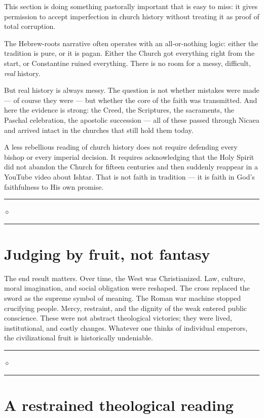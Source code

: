 \documentclass[10pt,twoside,openany]{book}
\newcommand{\ornrule}{%
  \par\bigskip
  {\noindent\hfil{\color{gold}\rule[0.5ex]{1.5in}{0.5pt}%
  \quad$\diamond$\quad%
  \rule[0.5ex]{1.5in}{0.5pt}}\hfil\par}%
  \bigskip
}
\begin{document}
\begin{westernbox}
This section is doing something pastorally important
that is easy to miss: it gives permission to accept
imperfection in church history without treating it as
proof of total corruption.

The Hebrew-roots narrative often operates with an
all-or-nothing logic: either the tradition is pure, or
it is pagan. Either the Church got everything right
from the start, or Constantine ruined everything. There
is no room for a messy, difficult, \emph{real} history.

But real history is always messy. The question is not
whether mistakes were made --- of course they were --- but
whether the core of the faith was transmitted. And here
the evidence is strong: the Creed, the Scriptures, the
sacraments, the Paschal celebration, the apostolic
succession --- all of these passed through Nicaea and
arrived intact in the churches that still hold them
today.

A less rebellious reading of church history does not
require defending every bishop or every imperial
decision. It requires acknowledging that the Holy
Spirit did not abandon the Church for fifteen centuries
and then suddenly reappear in a YouTube video about
Ishtar. That is not faith in tradition --- it is faith in
God's faithfulness to His own promise.
\end{westernbox}

\ornrule



\section{Judging by fruit, not fantasy}

The end result matters. Over time, the West was Christianized. Law,
culture, moral imagination, and social obligation were reshaped. The
cross replaced the sword as the supreme symbol of meaning. The Roman
war machine stopped crucifying people. Mercy, restraint, and the
dignity of the weak entered public conscience. These were not abstract
theological victories; they were lived, institutional, and costly
changes. Whatever one thinks of individual emperors, the civilizational
fruit is historically undeniable.

\ornrule



\section{A restrained theological reading}
\end{document}
